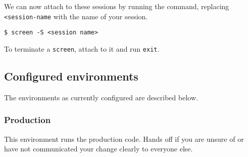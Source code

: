 We can now attach to these sessions by running the command, replacing
\texttt{\textless{}session-name} with the name of your session.

\begin{verbatim}
$ screen -S <session name>
\end{verbatim}

To terminate a \texttt{screen}, attach to it and run \texttt{exit}.

\subsection{Configured environments}\label{configured-environments}

The environments as currently configured are described below.

\subsubsection{Production}\label{production}

This environment runs the production code. Hands off if you are unsure
of or have not communicated your change clearly to everyone else.

